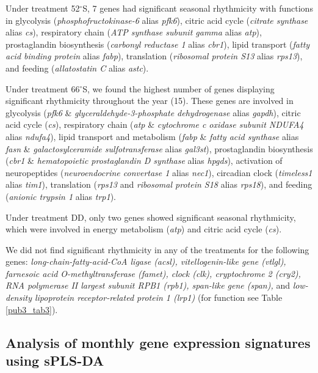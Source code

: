 Under treatment 52$^{\circ}$S, 7 genes had significant seasonal rhythmicity
with functions in glycolysis (\textit{phosphofructokinase-6} alias
\textit{pfk6}), citric acid cycle (\textit{citrate synthase} alias
\textit{cs}),  respiratory chain (\textit{ATP synthase subunit gamma} alias
\textit{atp}), prostaglandin biosynthesis (\textit{carbonyl reductase 1} alias
\textit{cbr1}), lipid transport (\textit{fatty acid binding protein} alias
\textit{fabp}), translation (\textit{ribosomal protein S13} alias
\textit{rps13}), and feeding (\textit{allatostatin C} alias \textit{astc}).

Under treatment 66$^{\circ}$S, we found the highest number of genes displaying
significant rhythmicity throughout the year (15). These genes are involved in
glycolysis (\textit{pfk6} \& \textit{glyceraldehyde-3-phosphate dehydrogenase}
alias \textit{gapdh}), citric acid cycle (\textit{cs}), respiratory chain
(\textit{atp} \& \textit{cytochrome c oxidase subunit NDUFA4} alias
\textit{ndufa4}), lipid transport and metabolism (\textit{fabp} \&
\textit{fatty acid synthase} alias \textit{fasn} \& \textit{galactosylceramide
sulfotransferase} alias \textit{gal3st}), prostaglandin biosynthesis
(\textit{cbr1} \& \textit{hematopoietic prostaglandin D synthase} alias
\textit{hpgds}), activation of neuropeptides (\textit{neuroendocrine convertase
1} alias \textit{nec1}), circadian clock (\textit{timeless1} alias
\textit{tim1}), translation (\textit{rps13} and \textit{ribosomal protein S18}
alias \textit{rps18}), and feeding (\textit{anionic trypsin 1} alias
\textit{trp1}).

Under treatment DD, only two genes showed significant seasonal rhythmicity,
which were involved in energy metabolism (\textit{atp}) and citric acid cycle
(\textit{cs}). 

We did not find significant rhythmicity in any of the treatments for the
following genes: \textit{long-chain-fatty-acid-CoA ligase (acsl),
vitellogenin-like gene (vtlgl), farnesoic acid O-methyltransferase (famet),
clock (clk), cryptochrome 2 (cry2), RNA polymerase II largest subunit RPB1
(rpb1), span-like gene (span),} and \textit{low-density lipoprotein
receptor-related protein 1 (lrp1)} (for function see Table \ref{pub3_tab3}).

\subsection{Analysis of monthly gene expression signatures using sPLS-DA}

